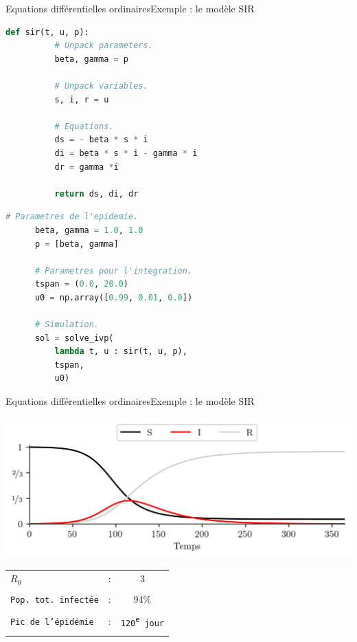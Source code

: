 \documentclass[usenames,dvipsnames,svgnames,10pt,aspectratio=169]{beamer}
\begin{document}
\begin{frame}[t, c, fragile]{Equations différentielles ordinaires}{Exemple : le modèle SIR}
  \begin{minipage}{.48\textwidth}
    \begin{lstlisting}[language=Python]
      def sir(t, u, p):
          # Unpack parameters.
          beta, gamma = p

          # Unpack variables.
          s, i, r = u

          # Equations.
          ds = - beta * s * i
          di = beta * s * i - gamma * i
          dr = gamma *i
          
          return ds, di, dr
    \end{lstlisting}
  \end{minipage}%
  \hfill
  \begin{minipage}{.48\textwidth}
    \begin{lstlisting}[language=Python]
      # Parametres de l'epidemie.
      beta, gamma = 1.0, 1.0
      p = [beta, gamma]

      # Parametres pour l'integration.
      tspan = (0.0, 20.0)
      u0 = np.array([0.99, 0.01, 0.0])

      # Simulation.
      sol = solve_ivp(
          lambda t, u : sir(t, u, p),
          tspan,
          u0)
    \end{lstlisting}
  \end{minipage}
\end{frame}

\begin{frame}[t, c]{Equations différentielles ordinaires}{Exemple : le modèle SIR}
  \begin{minipage}{.58\textwidth}
    \centering
    \includegraphics[width=\textwidth]{sir_model}
  \end{minipage}%
  \hfill
  \begin{minipage}{.38\textwidth}
    \begin{tabular}{lcc}
      \texttt{$R_0$} & : & 3 \\ \\
      \texttt{Pop.\ tot.\ infectée} & : & 94\% \\ \\
      \texttt{Pic de l'épidémie} & : & \texttt{120\textsuperscript{e} jour} \\ \\
    \end{tabular}
  \end{minipage}
\end{frame}
\end{document}
